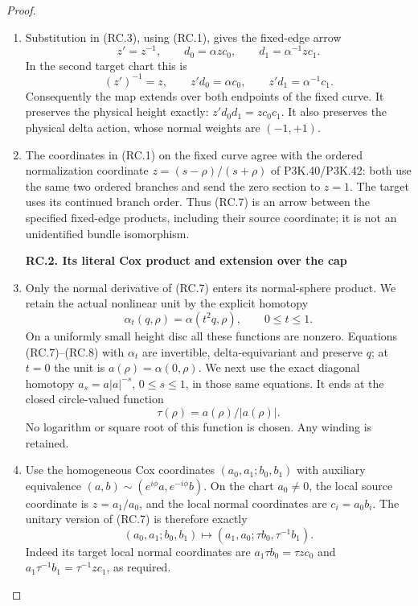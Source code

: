 \begin{proof}
\begin{enumerate}[label=\arabic*.]
\item Substitution in (RC.3), using (RC.1), gives the fixed-edge arrow
\[
 z'=z^{-1},\qquad
 d_0=\alpha z c_0,\qquad d_1=\alpha^{-1}z c_1.
                                                               \tag{RC.7}
\]
In the second target chart this is
\[
 (z')^{-1}=z,\qquad z'd_0=\alpha c_0,
                   \qquad z'd_1=\alpha^{-1}c_1.       \tag{RC.8}
\]
Consequently the map extends over both endpoints of the fixed curve.
It preserves the physical height exactly:
\(z'd_0d_1=z c_0c_1\). It also preserves the physical delta action,
whose normal weights are \((-1,+1)\).

\item The coordinates in (RC.1) on the fixed curve agree with the ordered
normalization coordinate \(z=(s-\rho)/(s+\rho)\) of P3K.40/P3K.42:
both use the same two ordered branches and send the zero section to
\(z=1\). The target uses its continued branch order. Thus (RC.7) is
an arrow between the specified fixed-edge products, including their
source coordinate; it is not an unidentified bundle isomorphism.

\par

\medskip\noindent\textbf{RC.2. Its literal Cox product and extension over the cap}

\par\nobreak

\item Only the normal derivative of (RC.7) enters its normal-sphere product.
We retain the actual nonlinear unit by the explicit homotopy
\[
 \alpha_t(q,\rho)=\alpha(t^2q,\rho),\qquad 0\le t\le1.
                                                               \tag{RC.9}
\]
On a uniformly small height disc all these functions are nonzero.
Equations (RC.7)--(RC.8) with \(\alpha_t\) are invertible,
delta-equivariant and preserve \(q\); at \(t=0\) the unit is
\(a(\rho)=\alpha(0,\rho)\). We next use the exact diagonal homotopy
\(a_s=a|a|^{-s}\), \(0\le s\le1\), in those same equations.
It ends at the closed circle-valued function
\[
                         \tau(\rho)=a(\rho)/|a(\rho)|. \tag{RC.10}
\]
No logarithm or square root of this function is chosen. Any winding
is retained.

\item Use the homogeneous Cox coordinates \((a_0,a_1;b_0,b_1)\) with
auxiliary equivalence
\((a,b)\sim(e^{i\phi}a,e^{-i\phi}b)\). On the chart \(a_0\ne0\),
the local source coordinate is \(z=a_1/a_0\), and the local normal
coordinates are \(c_i=a_0b_i\). The unitary version of (RC.7) is
therefore exactly
\[
 (a_0,a_1;b_0,b_1)
       \longmapsto(a_1,a_0;\tau b_0,\tau^{-1}b_1).
                                                               \tag{RC.11}
\]
Indeed its target local normal coordinates are
\(a_1\tau b_0=\tau zc_0\) and
\(a_1\tau^{-1}b_1=\tau^{-1}zc_1\), as required.


\end{enumerate}
\end{proof}
